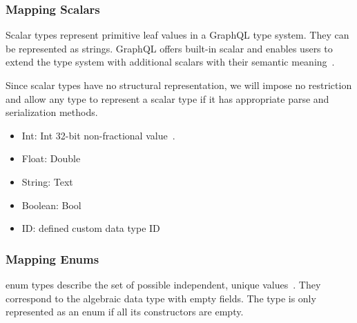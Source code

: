 \begin{frame}\frametitle{Mapping Scalars}

Scalar types represent primitive leaf values in a GraphQL type system. They can be represented as strings. GraphQL offers built-in scalar and enables users to extend the type system with additional scalars with their semantic meaning~\cite{gql-spec}.

Since scalar types have no structural representation, we will impose no restriction and allow any type to represent a scalar type if it has appropriate parse and serialization methods.

\begin{itemize}

  \item Int: Int
    32-bit non-fractional value~\cite{gql-spec}. 

  \item Float: Double

  \item String: Text
  \item Boolean: Bool
  \item ID:  defined custom data type ID 
\end{itemize}

\end{frame}

\begin{frame}\frametitle{Mapping Enums}

enum types describe the set of possible independent, unique values~\cite{gql-spec}. They correspond to the algebraic data type with empty fields. The type is only represented as an enum if all its constructors are empty.


\end{frame}

